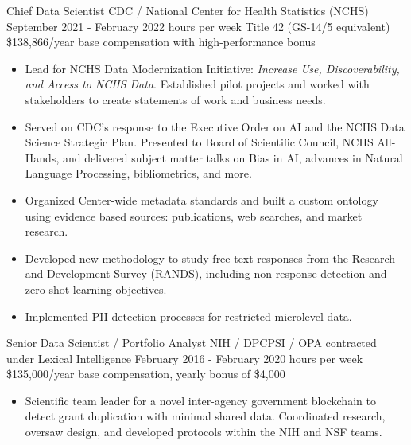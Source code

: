 \documentclass[]{scrartcl}
\begin{document}
\begin{cleanCV}
\vspace{1em}

    
  \WorkExperience
{}
{Chief Data Scientist}
{
  \newline CDC / National Center for Health Statistics (NCHS)
  \newline September 2021 - February 2022
   hours per week
  \newline Title 42 (GS-14/5 equivalent) \$138,866/year base compensation with high-performance bonus 
}
{
  \vspace{-0.25em}
  \begin{itemize}

   \item Lead for NCHS Data Modernization Initiative: \emph{Increase Use, Discoverability, and Access to NCHS Data}. Established pilot projects and worked with stakeholders to create statements of work and business needs.
   \item Served on CDC's response to the Executive Order on AI and the NCHS Data Science Strategic Plan. Presented to Board of Scientific Council, NCHS All-Hands, and delivered subject matter talks on Bias in AI, advances in Natural Language Processing, bibliometrics, and more.
   \item Organized Center-wide metadata standards and built a custom ontology using evidence based sources: publications, web searches, and market research.
   \item Developed new methodology to study free text responses from the Research and Development Survey (RANDS), including non-response detection and zero-shot learning objectives.
   \item Implemented PII detection processes for restricted microlevel data.
  \end{itemize}
}
  
  \WorkExperience
{}
{Senior Data Scientist / Portfolio Analyst}
{
  \newline NIH / DPCPSI / OPA contracted under Lexical Intelligence
  \newline February 2016 - February 2020
   hours per week
  \newline \$135,000/year base compensation, yearly bonus of \$4,000
}
{
  \vspace{-0.25em}
  \begin{itemize}
    
    \item Scientific team leader for a novel inter-agency government blockchain to detect grant duplication with minimal shared data. Coordinated research, oversaw design, and developed protocols within the NIH and NSF teams.


\end{itemize}}
\end{cleanCV}
\end{document}
